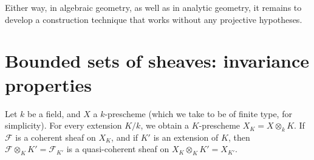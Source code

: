   Either way, in algebraic geometry, as well as in analytic geometry, it remains to develop a construction technique that works without any projective hypotheses.\chapter{Bounded sets of sheaves: invariance properties}\thispagestyle{fancy}\label{fga3.iv-1}\par{}Let \(k\) be a field, and \(X\) a \(k\)-prescheme (which we take to be of finite type, for simplicity).
  For every extension \(K/k\), we obtain a \(K\)-prescheme \(X_K=X\otimes _k K\).
  If \(\mathscr {F}\) is a coherent sheaf on \(X_K\), and if \(K'\) is an extension of \(K\), then \(\mathscr {F}\otimes _K K'=\mathscr {F}_{K'}\) is a quasi-coherent sheaf on \(X_K\otimes _KK'=X_{K'}\).
  

